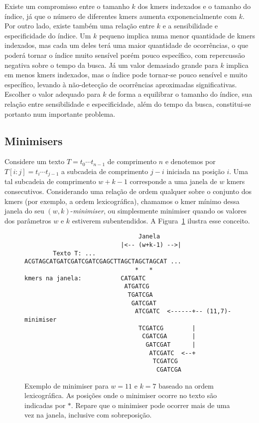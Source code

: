 \documentclass[12pt, a4paper, oneside]{article}
\begin{document}
Existe um compromisso entre o tamanho $k$ dos kmers indexados e o tamanho do índice, já que o número de diferentes kmers aumenta exponencialmente com $k$. Por outro lado, existe também uma relação entre $k$ e a sensibilidade e especificidade do índice. Um $k$ pequeno implica numa menor quantidade de kmers indexados, mas cada um deles terá uma maior quantidade de ocorrências, o que poderá tornar o índice muito sensível porém pouco específico, com repercussão negativa sobre o tempo da busca. Já um valor demasiado grande para $k$ implica em menos kmers indexados, mas o índice pode tornar-se pouco sensível e muito específico, levando à não-detecção de ocorrências aproximadas significativas. Escolher o valor adequado para $k$ de forma a equilibrar o tamanho do índice, sua relação entre sensibilidade e especificidade, além do tempo da busca, constitui-se portanto num importante problema.

\subsection*{Minimisers}

Considere um texto $T=t_0\cdots t_{n-1}$ de comprimento $n$ e denotemos por $T[i:j]=t_i\cdots t_{j-1}$ a subcadeia de comprimento $j-i$\/ iniciada na posição $i$. Uma tal subcadeia de comprimento $w+k-1$ corresponde a uma janela de $w$\/ kmers consecutivos. Considerando uma relação de ordem qualquer sobre o conjunto dos kmers (por exemplo, a ordem lexicográfica), chamamos o kmer mínimo dessa janela do seu $(w,k)$-\textit{minimiser}, ou simplesmente minimiser quando os valores dos parâmetros $w$ e $k$ estiverem subentendidos. A Figura~\ref{fig:minimiser} ilustra esse conceito.

\begin{figure}[htpb]
	\centering

	\begin{verbatim}
                                Janela
                           |<-- (w+k-1) -->|  
        Texto T: ... ACGTAGCATGATCGATCGATCGAGCTTAGCTAGCTAGCAT ...
                               *   *	
kmers na janela:           CATGATC
                            ATGATCG
                             TGATCGA
                              GATCGAT
                               ATCGATC  <------+-- (11,7)-minimiser 
                                TCGATCG        |
                                 CGATCGA       |
                                  GATCGAT      |
                                   ATCGATC  <--+
                                    TCGATCG
                                     CGATCGA
	\end{verbatim}
	\caption{Exemplo de minimiser para $w=11$ e $k=7$ baseado na ordem lexicográfica. As posições onde o minimiser ocorre no texto são indicadas por $*$. Repare que o minimiser pode ocorrer mais de uma vez na janela, inclusive com sobreposição.}
	\label{fig:minimiser}
\end{figure}
\end{document}
